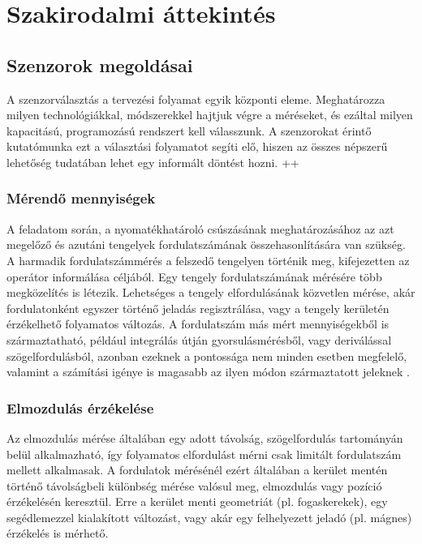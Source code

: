 \chapter{Szakirodalmi áttekintés}
\label{sec:Szakirodalom}
\section{Szenzorok megoldásai}

A szenzorválasztás a tervezési folyamat egyik központi eleme. Meghatározza milyen technológiákkal, módszerekkel hajtjuk végre a méréseket, és ezáltal milyen kapacitású, programozású rendszert kell válasszunk. A szenzorokat érintő kutatómunka ezt a választási folyamatot segíti elő, hiszen az összes népszerű lehetőség tudatában lehet egy informált döntést hozni. ++

\subsection{Mérendő mennyiségek}

A feladatom során, a nyomatékhatároló csúszásának meghatározásához az azt megelőző és azutáni tengelyek fordulatszámának összehasonlítására van szükség. A harmadik fordulatszámmérés a felszedő tengelyen történik meg, kifejezetten az operátor informálása céljából. Egy tengely fordulatszámának mérésére több megközelítés is létezik. Lehetséges a tengely elfordulásának közvetlen mérése, akár fordulatonként egyszer történő jeladás regisztrálása, vagy a tengely kerületén érzékelhető folyamatos változás. A fordulatszám más mért mennyiségekből is származtatható, például integrálás útján gyorsulásmérésből, vagy deriválással szögelfordulásból, azonban ezeknek a pontossága nem minden esetben megfelelő, valamint a számítási igénye is magasabb az ilyen módon származtatott jeleknek \cite{Morris2016a}.

\subsection{Elmozdulás érzékelése}

Az elmozdulás mérése általában egy adott távolság, szögelfordulás tartományán belül alkalmazható, így folyamatos elfordulást mérni csak limitált fordulatszám mellett alkalmasak. A fordulatok mérésénél ezért általában a kerület mentén történő távolságbeli különbség mérése valósul meg, elmozdulás vagy pozíció érzékelésén keresztül. Erre a kerület menti geometriát (pl. fogaskerekek), egy segédlemezzel kialakított változást, vagy akár egy felhelyezett jeladó (pl. mágnes) érzékelés is mérhető.

